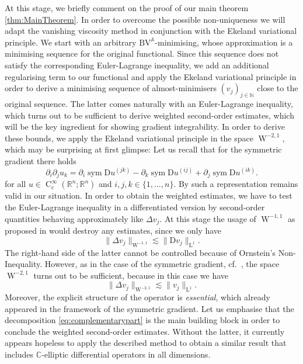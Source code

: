 \documentclass[a4paper,10pt,reqno,oneside]{amsart}
\numberwithin{equation}{section}
\newcommand{\R}{\mathbb R}
\newcommand{\C}{\mathbb C}
\newcommand{\N}{\mathbb N}
\newcommand{\Aop}{\mathbb{A}}
\newcommand{\lebe}{\operatorname{L}}
\newcommand{\sobo}{\operatorname{W}}
\newcommand{\hold}{\operatorname{C}}
\newcommand{\BV}{\mathrm{BV}}
\newcommand{\D}{\mathrm{D}}
\newcommand{\sym}{\operatorname{sym}}
\newcommand{\eps}{\varepsilon}
\newcommand{\del}{\partial}
\renewcommand{\L}{\mathrm{L}}
\begin{document}
 At this stage, we briefly comment on the proof of our main theorem \eqref{thm:MainTheorem}. In order to overcome the possible non-uniqueness we will adapt the vanishing viscosity method in conjunction with the Ekeland variational principle. We start with an arbitrary $\BV^\Aop$-minimising, whose approximation is a minimising sequence for the original functional. Since this sequence does not satisfy the corresponding Euler-Lagrange inequality, we add an additional regularising term to our functional and apply the Ekeland variational principle in order to derive a minimising sequence of almost-minimisers $(v_j)_{j\in\N}$ close to the original sequence. The latter comes naturally with an Euler-Lagrange inequality, which turns out to be sufficient to derive weighted  second-order estimates, which will be the key ingredient for showing gradient integrability. In order to derive these bounds, we apply the Ekeland variational principle in the space $\sobo^{-2,1}$, which may be surprising at first glimpse: Let us recall that for the symmetric gradient there holds
 \begin{equation*}
 	\partial_{i}\partial_j u_k=\partial_i \sym\D u^{(jk)}-\partial_k \sym\D u^{(ij)}+\partial_j \sym\D u^{(ik)}.
 \end{equation*}
for all $u\in\hold^\infty_c(\R^n;\R^n)$ and $i,j,k\in\{1,\dots,n\}$.  By   such a representation remains valid in our situation. In order to obtain the weighted estimates, we have to test the Euler-Lagrange inequality in a differentiated version by second-order quantities behaving approximately like $\Delta v_j$. At this stage the usage of $\sobo^{-1,1}$ as proposed in \cite{BeckSchmidt} would destroy any estimates, since we only have 
\begin{equation*}
	\|\Delta v_j\|_{\sobo^{-1,1}}\lesssim \|\D v_j\|_{\L^1}.
\end{equation*}
The right-hand side of the latter cannot be controlled because of Ornstein's Non-Inequality. However, as in the case of the symmetric gradient, cf.~\cite{Gmeineder, BEG}, the space $\sobo^{-2,1}$ turns out to be sufficient, because in this case we have 
\begin{equation*}
	\|\Delta v_j\|_{\sobo^{-2,1}}\lesssim \|v_j\|_{\lebe^1}.
\end{equation*}
Moreover, the explicit structure of the operator is \textit{essential}, which already appeared in the framework of the symmetric gradient. Let us emphasise that the decomposition \eqref{eq:complementarypart} is the main building block in order to conclude the weighted second-order estimates. Without the latter, it currently appears hopeless to apply the described method to obtain a similar result that includes $\C$-elliptic differential operators in all dimensions. 
\end{document}
